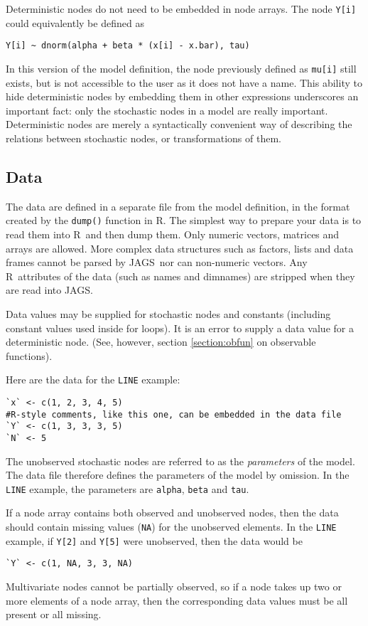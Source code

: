 \documentclass[11pt, a4paper, titlepage]{report}
\newcommand{\JAGS}{\textsf{JAGS}}
\newcommand{\R}{\textsf{R}}
\begin{document}
Deterministic nodes do not need to be embedded in node arrays. The
node \verb+Y[i]+ could equivalently be defined as
\begin{verbatim}
Y[i] ~ dnorm(alpha + beta * (x[i] - x.bar), tau)
\end{verbatim}
In this version of the model definition, the node previously defined
as \verb+mu[i]+ still exists, but is not accessible to the user as it
does not have a name.  This ability to hide deterministic nodes by
embedding them in other expressions underscores an important fact:
only the stochastic nodes in a model are really
important. Deterministic nodes are merely a syntactically convenient
way of describing the relations between stochastic nodes, or
transformations of them.

\subsection{Data}
\label{section:data}

The data are defined in a separate file from the model definition, in
the format created by the \texttt{dump()} function in \R.  The
simplest way to prepare your data is to read them into \R\ and then
dump them.  Only numeric vectors, matrices and arrays are
allowed. More complex data structures such as factors, lists and data
frames cannot be parsed by \JAGS\, nor can non-numeric vectors.  Any
\R\ attributes of the data (such as names and dimnames) are stripped
when they are read into \JAGS.

Data values may be supplied for stochastic nodes and constants
(including constant values used inside for loops). It is an error to
supply a data value for a deterministic node. (See, however, section
\ref{section:obfun} on observable functions).

Here are the data for the \verb+LINE+ example:
\begin{verbatim}
`x` <- c(1, 2, 3, 4, 5)
#R-style comments, like this one, can be embedded in the data file
`Y` <- c(1, 3, 3, 3, 5)
`N` <- 5
\end{verbatim}

The unobserved stochastic nodes are referred to as the {\em
  parameters} of the model. The data file therefore defines the
parameters of the model by omission. In the \verb+LINE+ example, the
parameters are \texttt{alpha}, \texttt{beta} and \texttt{tau}.

If a node array contains both observed and unobserved nodes, then the
data should contain missing values (\texttt{NA}) for the unobserved
elements. In the \verb+LINE+ example, if \verb+Y[2]+ and \verb+Y[5]+
were unobserved, then the data would be
\begin{verbatim}
`Y` <- c(1, NA, 3, 3, NA)
\end{verbatim}
Multivariate nodes cannot be partially observed, so if a node takes up
two or more elements of a node array, then the corresponding data
values must be all present or all missing.
\end{document}
